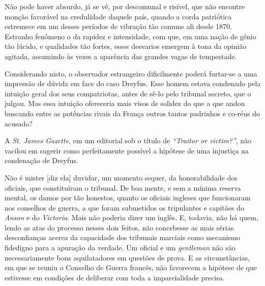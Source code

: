 Não pode haver absurdo, já se vê, por descomunal e risível, que não
encontre monção favorável na credulidade daquele país, quando a corda
patriótica estremece em um desses períodos de vibração tão comuns ali
desde 1870. Estranho fenômeno o da rapidez e intensidade, com que, em
uma nação de gênio tão lúcido, e qualidades tão fortes, esses desvarios
emergem à tona da opinião agitada, assumindo às vezes a aparência das
grandes vagas de tempestade.

Considerando nisto, o observador estrangeiro dificilmente poderá
furtar-se a uma impressão de dúvida em face do caso Dreyfus. Esse
homem estava condenado pela intuição geral dos seus compatriotas, antes
de sê-lo pelo tribunal secreto, que o julgou. Mas essa intuição
ofereceria mais visos de solidez do que a que andou buscando entre as
potências rivais da França outros tantos padrinhos e co-réus do
acusado?

A \textit{St. James Gazette}, em um editorial sob o título de
\textit{``Traitor or victim?''}, não vacilou em
sugerir como perfeitamente possível a hipótese de uma injustiça na
condenação de Dreyfus.

\begin{hedraquote}
Não é mister [diz ela] duvidar, um momento sequer, da honorabilidade dos
oficiais, que constituíram o tribunal. De boa mente, e sem a mínima
reserva mental, os damos por tão honestos, quanto os oficiais ingleses
que funcionaram nos conselhos de guerra, a que foram submetidos os
tripulantes e capitães do \textit{Anson} e do \textit{Victoria}. Mais não poderia dizer
um inglês. E, todavia, não há quem, lendo as atas do processo nesses
dois feitos, não concebesse as mais sérias desconfianças acerca da
capacidade dos tribunais marciais como mecanismo fidedigno para a
apuração da verdade. Um oficial e um \textit{gentleman} não são necessariamente
bons aquilatadores em questões de prova. E as circunstâncias, em que se
reuniu o Conselho de Guerra francês, não favorecem a hipótese de que
estivesse em condições de deliberar com toda a imparcialidade precisa.
\end{hedraquote}

